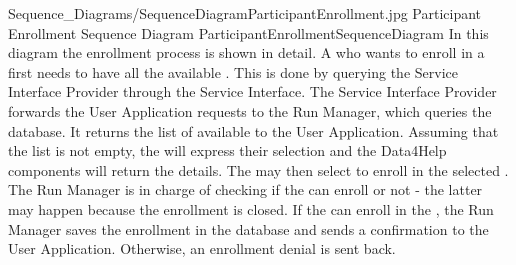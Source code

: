 \documentclass[../../DD.tex]{subfiles}
\begin{document}
	\image {13cm} {Sequence_Diagrams/SequenceDiagramParticipantEnrollment.jpg} {Participant Enrollment Sequence Diagram} {ParticipantEnrollmentSequenceDiagram}
	In this diagram the  enrollment process is shown in detail. A  who wants to enroll in a  first needs to have all the available . This is done by querying the Service Interface Provider through the Service Interface. The Service Interface Provider forwards the User Application requests to the Run Manager, which queries the database. It returns the list of available  to the User Application. Assuming that the list is not empty, the  will express their selection and the Data4Help components will return the  details. The  may then select to enroll in the selected . The Run Manager is in charge of checking if the  can enroll or not - the latter may happen because the enrollment is closed. If the  can enroll in the , the Run Manager saves the  enrollment in the database and sends a confirmation to the User Application. Otherwise, an enrollment denial is sent back.
\end{document}
